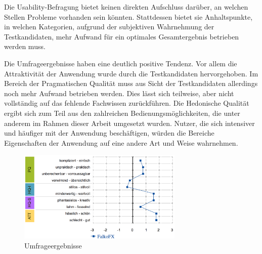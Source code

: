Die Usability-Befragung bietet keinen direkten Aufschluss darüber, an welchen Stellen Probleme vorhanden sein könnten. Stattdessen bietet sie Anhaltspunkte, in welchen Kategorien, aufgrund der subjektiven Wahrnehmung der Testkandidaten, mehr Aufwand für ein optimales Gesamtergebnis betrieben werden muss.\par
Die Umfrageergebnisse haben eine deutlich positive Tendenz. Vor allem die Attraktivität der Anwendung wurde durch die Testkandidaten hervorgehoben. Im Bereich der Pragmatischen Qualität muss aus Sicht der Testkandidaten allerdings noch mehr Aufwand betrieben werden. Dies lässt sich teilweise, aber nicht vollständig auf das fehlende Fachwissen zurückführen. Die Hedonische Qualität ergibt sich zum Teil aus den zahlreichen Bedienungsmöglichkeiten, die unter anderem im Rahmen dieser Arbeit umgesetzt wurden. Nutzer, die sich intensiver und häufiger mit der Anwendung beschäftigen, würden die Bereiche Eigenschaften der Anwendung auf eine andere Art und Weise wahrnehmen.\par
\begin{figure}[H]
 \centering
 \includegraphics[width=0.7\textwidth]{grafiken/word_pairs.png}
 \caption{Umfrageergebnisse}
 \label{fig:surveyResults}
\end{figure}

